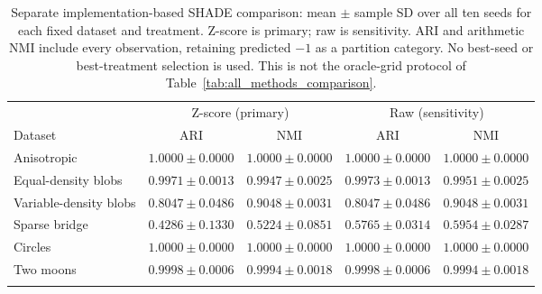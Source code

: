 \begin{table}[t]
\centering
\caption{Separate implementation-based SHADE comparison: mean $\pm$ sample SD
over all ten seeds for each fixed dataset and treatment. Z-score is primary;
raw is sensitivity. ARI and arithmetic NMI include every observation, retaining
predicted $-1$ as a partition category. No best-seed or best-treatment selection
is used. This is not the oracle-grid protocol of
Table~\ref{tab:all_methods_comparison}.}
\label{tab:shade_comparison}
\small
\setlength{\tabcolsep}{3pt}
\begin{tabular}{@{}lcccc@{}}
\toprule
 & \multicolumn{2}{c}{Z-score (primary)} & \multicolumn{2}{c}{Raw (sensitivity)} \\
\cmidrule(lr){2-3}\cmidrule(lr){4-5}
Dataset & ARI & NMI & ARI & NMI \\
\midrule
Anisotropic & $1.0000\pm0.0000$ & $1.0000\pm0.0000$ & $1.0000\pm0.0000$ & $1.0000\pm0.0000$ \\
Equal-density blobs & $0.9971\pm0.0013$ & $0.9947\pm0.0025$ & $0.9973\pm0.0013$ & $0.9951\pm0.0025$ \\
Variable-density blobs & $0.8047\pm0.0486$ & $0.9048\pm0.0031$ & $0.8047\pm0.0486$ & $0.9048\pm0.0031$ \\
Sparse bridge & $0.4286\pm0.1330$ & $0.5224\pm0.0851$ & $0.5765\pm0.0314$ & $0.5954\pm0.0287$ \\
Circles & $1.0000\pm0.0000$ & $1.0000\pm0.0000$ & $1.0000\pm0.0000$ & $1.0000\pm0.0000$ \\
Two moons & $0.9998\pm0.0006$ & $0.9994\pm0.0018$ & $0.9998\pm0.0006$ & $0.9994\pm0.0018$ \\
\botrule
\end{tabular}
\end{table}
